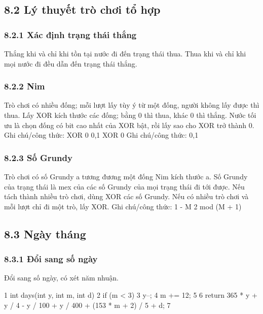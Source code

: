 \documentclass[11pt]{article}
\begin{document}
\subsection{8.2 Lý thuyết trò chơi tổ hợp}
\subsubsection{8.2.1 Xác định trạng thái thắng}
\begin{NoteBlock}
Thắng khi và chỉ khi tồn tại nước đi đến trạng thái thua.
Thua khi và chỉ khi mọi nước đi đều dẫn đến trạng thái thắng.
\end{NoteBlock}
\subsubsection{8.2.2 Nim}
\begin{NoteBlock}
Trò chơi có nhiều đống; mỗi lượt lấy tùy ý từ một đống, người không lấy được thì thua.
Lấy XOR kích thước các đống; bằng 0 thì thua, khác 0 thì thắng.
Nước tối ưu là chọn đống có bit cao nhất của XOR bật, rồi lấy sao cho XOR trở thành 0.
Ghi chú/công thức: XOR   0   0,1  XOR   0
Ghi chú/công thức: 0,1
\end{NoteBlock}
\subsubsection{8.2.3 Số Grundy}
\begin{NoteBlock}
Trò chơi có số Grundy a tương đương một đống Nim kích thước a.
Số Grundy của trạng thái là mex của các số Grundy của mọi trạng thái đi tới được.
Nếu tách thành nhiều trò chơi, dùng XOR các số Grundy.
Nếu có nhiều trò chơi và mỗi lượt chỉ đi một trò, lấy XOR.
Ghi chú/công thức: 1 - M   2   mod (M + 1)
\end{NoteBlock}
\subsection{8.3 Ngày tháng}
\subsubsection{8.3.1 Đổi sang số ngày}
\begin{NoteBlock}
Đổi sang số ngày, có xét năm nhuận.
\end{NoteBlock}
\begin{Code}
1 int days(int y, int m, int d) {
2 if (m < 3) {
3 y--;
4 m += 12;
5 }
6 return 365 * y + y / 4 - y / 100 + y / 400 + (153 * m + 2) / 5 + d;
7 }
\end{Code}
\end{document}
